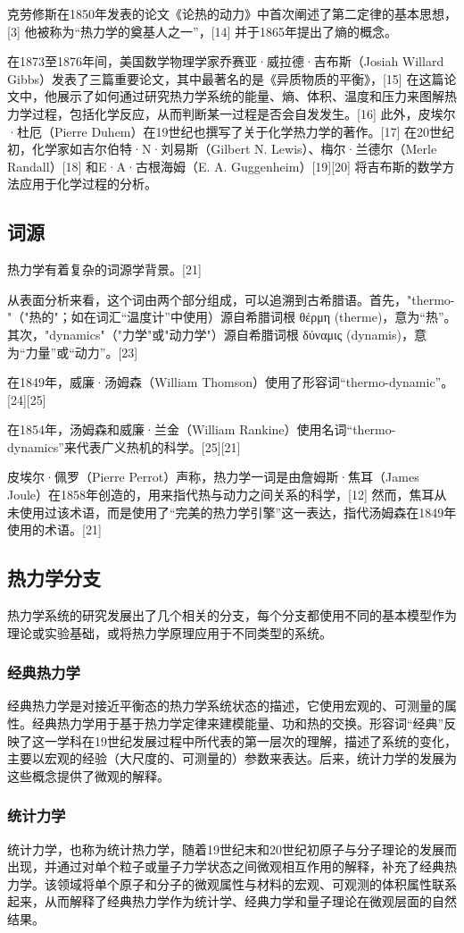 克劳修斯在1850年发表的论文《论热的动力》中首次阐述了第二定律的基本思想，[3] 他被称为“热力学的奠基人之一”，[14] 并于1865年提出了熵的概念。

在1873至1876年间，美国数学物理学家乔赛亚·威拉德·吉布斯（Josiah Willard Gibbs）发表了三篇重要论文，其中最著名的是《异质物质的平衡》，[15] 在这篇论文中，他展示了如何通过研究热力学系统的能量、熵、体积、温度和压力来图解热力学过程，包括化学反应，从而判断某一过程是否会自发发生。[16] 此外，皮埃尔·杜厄（Pierre Duhem）在19世纪也撰写了关于化学热力学的著作。[17] 在20世纪初，化学家如吉尔伯特·N·刘易斯（Gilbert N. Lewis）、梅尔·兰德尔（Merle Randall）[18] 和E·A·古根海姆（E. A. Guggenheim）[19][20] 将吉布斯的数学方法应用于化学过程的分析。
\subsection{词源}  
热力学有着复杂的词源学背景。[21]

从表面分析来看，这个词由两个部分组成，可以追溯到古希腊语。首先，"thermo-"（"热的"；如在词汇“温度计”中使用）源自希腊词根 θέρμη (therme)，意为“热”。其次，"dynamics"（"力学"或"动力学"）源自希腊词根 δύναμις (dynamis)，意为“力量”或“动力”。[23]

在1849年，威廉·汤姆森（William Thomson）使用了形容词“thermo-dynamic”。[24][25]

在1854年，汤姆森和威廉·兰金（William Rankine）使用名词“thermo-dynamics”来代表广义热机的科学。[25][21]

皮埃尔·佩罗（Pierre Perrot）声称，热力学一词是由詹姆斯·焦耳（James Joule）在1858年创造的，用来指代热与动力之间关系的科学，[12] 然而，焦耳从未使用过该术语，而是使用了“完美的热力学引擎”这一表达，指代汤姆森在1849年使用的术语。[21]
\subsection{热力学分支}  
热力学系统的研究发展出了几个相关的分支，每个分支都使用不同的基本模型作为理论或实验基础，或将热力学原理应用于不同类型的系统。
\subsubsection{经典热力学}  
经典热力学是对接近平衡态的热力学系统状态的描述，它使用宏观的、可测量的属性。经典热力学用于基于热力学定律来建模能量、功和热的交换。形容词“经典”反映了这一学科在19世纪发展过程中所代表的第一层次的理解，描述了系统的变化，主要以宏观的经验（大尺度的、可测量的）参数来表达。后来，统计力学的发展为这些概念提供了微观的解释。
\subsubsection{统计力学}  
统计力学，也称为统计热力学，随着19世纪末和20世纪初原子与分子理论的发展而出现，并通过对单个粒子或量子力学状态之间微观相互作用的解释，补充了经典热力学。该领域将单个原子和分子的微观属性与材料的宏观、可观测的体积属性联系起来，从而解释了经典热力学作为统计学、经典力学和量子理论在微观层面的自然结果。
